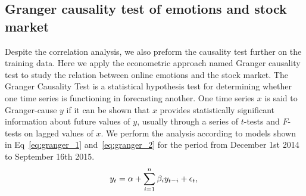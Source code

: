 \documentclass[aps,preprint,groupedaddress]{revtex4-1}
\begin{document}
\begin{figure}
\centering
{}
\hfil
{}
\hfil
{}
\hfil
{}
\hfil
{}
\caption{{\color{black}{Pearson correlation coefficient between five targets of stock market and shuffled online emotion data.}}}
\label{fig:shuffle}
\end{figure}


\subsection{Granger causality test of emotions and stock market}
\label{sec:granger}
Despite the correlation analysis, we also preform the causality test further on the training data. Here we apply the econometric approach named Granger causality test to study the relation between online emotions and the stock market. The Granger Causality Test is a statistical hypothesis test for determining whether one time series is functioning in forecasting another. One time series $x$ is said to Granger-cause $y$ if it can be shown that $x$ provides statistically significant information about future values of $y$, usually through a series of $t$-tests and $F$-tests on lagged values of $x$. We perform the analysis according to models shown in Eq~\ref{eq:granger_1} and~\ref{eq:granger_2} for the period from December 1st 2014 to September 16th 2015.
\begin{equation}
 y_{t} = \alpha + \sum_{i=1}^{n}\beta_{i}y_{t-i} + \epsilon_{t}, \\
\label{eq:granger_1}
\end{equation}
\end{document}

